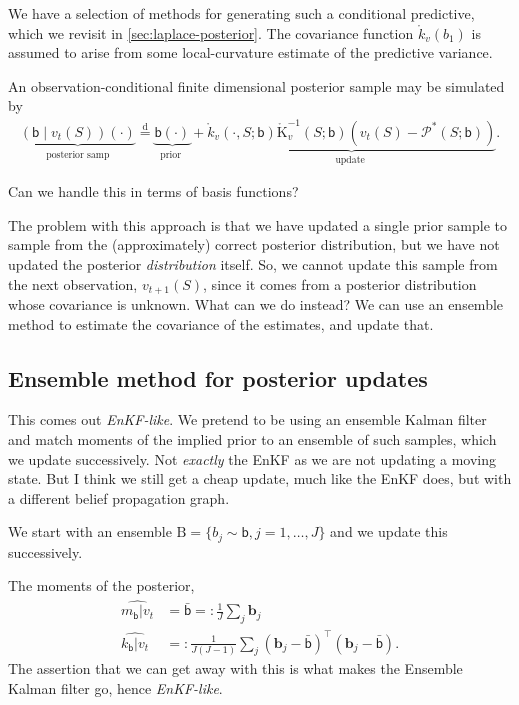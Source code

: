 \documentclass{article}
\newcommand{\vv}[1]{\boldsymbol{#1}}
\newcommand{\mm}[1]{\mathrm{#1}}
\newcommand{\rv}[1]{\mathsf{#1}}
\newcommand{\set}[1]{#1}
\newcommand{\op}[1]{\mathscr{#1}}
\newcommand{\disteq}{\stackrel{\mathrm{d}}{=}}
\newcommand{\gvn}{\mid}
\newcommand{\lat}{\rv{b}}   %
\newcommand{\latst}{b}      %
\begin{document}
We have a selection of methods for generating such a conditional predictive, which we revisit in \ref{sec:laplace-posterior}.
The covariance function \(\mathring{k}_{v}(\latst_{1})\) is assumed to arise from some local-curvature estimate of the predictive variance.

An observation-conditional finite dimensional posterior sample may be simulated by~\cite{WilsonPathwise2021}
\begin{align*}
\underbrace{
  (\lat \gvn v_{t}(\set{S}))(\cdot)}_{\text {posterior samp}
  } \disteq
\underbrace{
  \lat(\cdot)}_{\text {prior }
}
+\underbrace{
  \mathring{k}_{v}(\cdot, \set{S};\lat) \mathring{\mm{K}}_{v}^{-1}(\set{S};\lat)\left(v_{t}(\set{S})-\op{P}^*(\set{S};\lat)\right)
}_{\text {update }}.
\end{align*}

Can we handle this in terms of basis functions?~\cite[4.5]{WilsonPathwise2021}

The problem with this approach is that we have updated a single prior sample to sample from the (approximately) correct posterior distribution, but we have not updated the posterior \emph{distribution} itself.
So, we cannot update this sample from the next observation, \(v_{t+1}(\set{S})\), since it comes from a posterior distribution whose covariance is unknown.
What can we do instead?
We can use an ensemble method to estimate the covariance of the estimates, and update that.

\subsection{Ensemble method for posterior updates}

This comes out \emph{EnKF-like}.
We pretend to be using an ensemble Kalman filter and match moments of the implied prior to an ensemble of such samples, which we update successively.
Not \emph{exactly} the EnKF as we are not updating a moving state.
But I think we still get a cheap update, much like the EnKF does, but with a different belief propagation graph.

We start with an ensemble \(\mm{B}=\{\latst_{j}\sim \lat,j=1,\dots,J\}\) and we update this successively.

The moments of the posterior,
\begin{align}
    \widehat{m_{\lat}|v_{t}}
    &= \bar{\lat}
    =: \frac1J\sum_{j}\vv{b}_j\\
    \widehat{k_{\lat}|v_{t}}
    &=: \frac1{J(J-1)}\sum_{j}\left(\vv{b}_j-\bar{\lat}\right)^\top\left(\vv{b}_j-\bar{\lat}\right).
\end{align}
The assertion that we can get away with this is what makes the Ensemble Kalman filter go, hence \emph{EnKF-like}.
\end{document}
